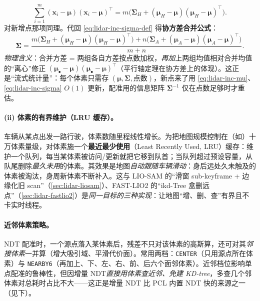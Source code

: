\begin{equation}
  \sum_{i=1}^m(\mathbf{x}_i-\boldsymbol\mu)(\mathbf{x}_i-\boldsymbol\mu)^\top=m\big(\boldsymbol\Sigma_H+(\boldsymbol\mu_H-\boldsymbol\mu)(\boldsymbol\mu_H-\boldsymbol\mu)^\top\big).
  \label{eq:lidar-inc-left}
\end{equation}
对新增点那项同理。代回 \cref{eq:lidar-inc-sigma-def} 得\textbf{协方差合并公式}：
\begin{equation}
  \boldsymbol\Sigma=\frac{m\big(\boldsymbol\Sigma_H+(\boldsymbol\mu_H-\boldsymbol\mu)(\boldsymbol\mu_H-\boldsymbol\mu)^\top\big)+n\big(\boldsymbol\Sigma_A+(\boldsymbol\mu_A-\boldsymbol\mu)(\boldsymbol\mu_A-\boldsymbol\mu)^\top\big)}{m+n}.
  \label{eq:lidar-inc-sigma}
\end{equation}
\emph{物理含义}：合并方差 = 两组各自方差按点数加权，\emph{再加}上两组均值相对合并均值的“离心”修正 $(\boldsymbol\mu_\bullet-\boldsymbol\mu)(\boldsymbol\mu_\bullet-\boldsymbol\mu)^\top$（平行轴定理在协方差上的体现）。这正是“流式统计量”：每个体素只需存 $(\boldsymbol\mu,\boldsymbol\Sigma,\text{点数})$，新点来了用 \cref{eq:lidar-inc-mu}、\cref{eq:lidar-inc-sigma} $O(1)$ 更新，配准用的信息矩阵 $\boldsymbol\Sigma^{-1}$ 仅在点数足够时才重估。

\paragraph{(ii) 体素的有界维护（LRU 缓存）。}
车辆从某点出发一路行驶，体素数随里程线性增长。为把地图规模控制在（如）十万体素量级，对体素施一个\textbf{最近最少使用}（Least Recently Used, LRU）缓存\cite{gao2023slamad}：维护一个队列，每当某体素被访问/更新就把它移到队首；当队列超过预设容量，从队尾删除\emph{最久未用}的体素。其效果是地图\emph{自动跟随车辆滑动}：身后远处久未触及的体素被淘汰，身周新体素不断补入。这与 LIO-SAM 的“滑窗 sub-keyframe + 边缘化旧 scan”（\cref{sec:lidar-liosam}）、FAST-LIO2 的“ikd-Tree 盒删远点”（\cref{sec:lidar-fastlio2}）是\emph{同一目标的三种实现}：让地图“增、删、查”有界且不卡实时线程。

\paragraph{近邻体素策略。}
NDT 配准时，一个源点落入某体素后，残差不只对该体素的高斯算，还可对其\emph{邻接体素}一并算（增大吸引域、平滑代价面）。常用两档：\texttt{CENTER}（只用源点所在体素）与 \texttt{NEARBY6}（再加上、下、左、右、前、后六个面邻体素）\cite{gao2023slamad}。近邻档位影响单点配准的鲁棒性，但因增量 NDT\emph{直接用体素查近邻、免建 KD-tree}，多查几个邻体素对总耗时占比不大——这正是增量 NDT 比 PCL 内置 NDT 快的来源之一（见下）。

